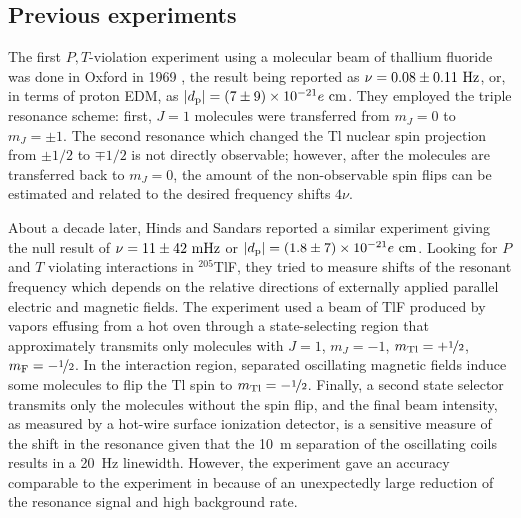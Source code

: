 \subsection{Previous experiments}

The first $P,T$-violation experiment using a molecular beam of thallium fluoride
was done in Oxford in 1969 \cite{harrison1969experimental}, the result being
reported as $\nu=0.08\pm0.11~\mathrm{Hz}$, or, in terms of proton \gls{EDM}, as
$|d_\text{p}|=(7\pm9)\times10^{-21}e~\mathrm{cm}$. They employed the triple resonance
scheme: first, $J=1$ molecules were transferred from $m_J=0$ to $m_J=\pm1$. The
second resonance which changed the Tl nuclear spin projection from $\pm1/2$ to
$\mp1/2$ is not directly observable; however, after the molecules are
transferred back to $m_J=0$, the amount of the non-observable spin flips can be
estimated and related to the desired frequency shifts $4\nu$.

About a decade later, Hinds and Sandars \cite{hinds1980experiment} reported a
similar experiment giving the null result of $\nu=11\pm42~\mathrm{mHz}$ or
$|d_\text{p}|=(1.8\pm7)\times10^{-21}e~\mathrm{cm}$. Looking for $P$ and $T$ violating
interactions in $^{205}$TlF, they tried to measure shifts of the resonant
frequency which depends on the relative directions of externally applied
parallel electric and magnetic fields. The experiment used a beam of TlF
produced by vapors effusing from a hot oven through a state-selecting region
that approximately transmits only molecules with $J=1$, $m_J=-1$,
$m_\text{Tl}=+\nicefrac{1}{2}$, $m_\text{F}=-\nicefrac{1}{2}$. In the
interaction region, separated oscillating magnetic fields induce some molecules
to flip the Tl spin to $m_\text{Tl}=-\nicefrac{1}{2}$. Finally, a second state
selector transmits only the molecules without the spin flip, and the final beam
intensity, as measured by a hot-wire surface ionization detector, is a sensitive
measure of the shift in the resonance given that the 10~m separation of the
oscillating coils results in a 20~Hz linewidth. However, the experiment gave an
accuracy comparable to the experiment in \cite{harrison1969experimental} because
of an unexpectedly large reduction of the resonance signal and high background
rate.

